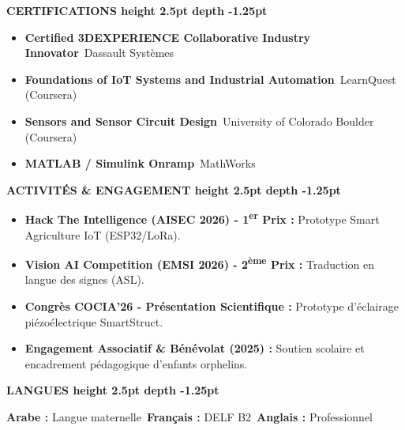\documentclass[10pt,a4paper]{altacv}
\renewcommand{\cvsection}[2][]{%
  \vspace{2.5pt}%
  {\color{heading}\Large\bfseries #2 \hspace{0.2em}\leaders\vrule height 2.5pt depth -1.25pt\hfill\mbox{}}\par\vspace{2pt}
}
\begin{document}
\cvsection{CERTIFICATIONS}
\begin{itemize}[leftmargin=*, label=\textbullet, nosep, itemsep=1.5pt]
  \item \textbf{Certified 3DEXPERIENCE Collaborative Industry Innovator}~\hfill {\color{emphasis}Dassault Systèmes}
  \item \textbf{Foundations of IoT Systems and Industrial Automation}~\hfill {\color{emphasis}LearnQuest (Coursera)}
  \item \textbf{Sensors and Sensor Circuit Design}~\hfill {\color{emphasis}University of Colorado Boulder (Coursera)}
  \item \textbf{MATLAB / Simulink Onramp}~\hfill {\color{emphasis}MathWorks}
\end{itemize}

\cvsection{ACTIVITÉS \& ENGAGEMENT}
\begin{itemize}[leftmargin=*, label=\textbullet, nosep, itemsep=1.5pt]
  \item \textbf{Hack The Intelligence (AISEC 2026) - 1\textsuperscript{er} Prix :} Prototype Smart Agriculture IoT (ESP32/LoRa).
  \item \textbf{Vision AI Competition (EMSI 2026) - 2\textsuperscript{ème} Prix :} Traduction en langue des signes (ASL).
  \item \textbf{Congrès COCIA’26 - Présentation Scientifique :} Prototype d’éclairage piézoélectrique SmartStruct.
  \item \textbf{Engagement Associatif \& Bénévolat (2025) :} Soutien scolaire et encadrement pédagogique d'enfants orphelins.
\end{itemize}

\cvsection{LANGUES}
\textbf{Arabe :} Langue maternelle~\hfill \textbf{Français :} DELF B2~\hfill \textbf{Anglais :} Professionnel
\end{document}
